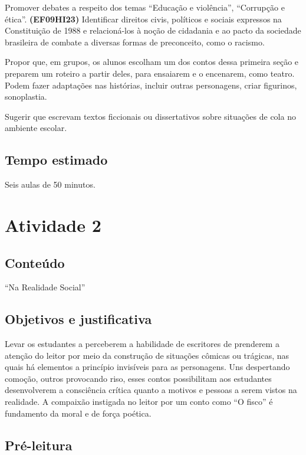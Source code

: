 Promover debates a respeito dos temas ``Educação e violência'',
``Corrupção e ética''. \textbf{(EF09HI23)} Identificar direitos civis,
políticos e sociais expressos na Constituição de 1988 e relacioná-los à
noção de cidadania e ao pacto da sociedade brasileira de combate a
diversas formas de preconceito, como o racismo.

Propor que, em grupos, os alunos escolham um dos contos dessa primeira
seção e preparem um roteiro a partir deles, para ensaiarem e o
encenarem, como teatro. Podem fazer adaptações nas histórias, incluir
outras personagens, criar figurinos, sonoplastia. 

Sugerir que escrevam textos ficcionais ou dissertativos sobre situações
de cola no ambiente escolar. 

\subsection{Tempo estimado}

Seis aulas de 50 minutos.

\section{Atividade 2}

\subsection{Conteúdo}

``Na Realidade Social''

\subsection{Objetivos e justificativa}

Levar os estudantes a perceberem a habilidade de escritores de prenderem
a atenção do leitor por meio da construção de situações cômicas ou
trágicas, nas quais há elementos a princípio invisíveis para as
personagens. Uns despertando comoção, outros provocando riso, esses
contos possibilitam aos estudantes desenvolverem a consciência crítica
quanto a motivos e pessoas a serem vistos na realidade. A compaixão
instigada no leitor por um conto como ``O fisco'' é fundamento da moral
e de força poética.

\subsection{Pré-leitura}

